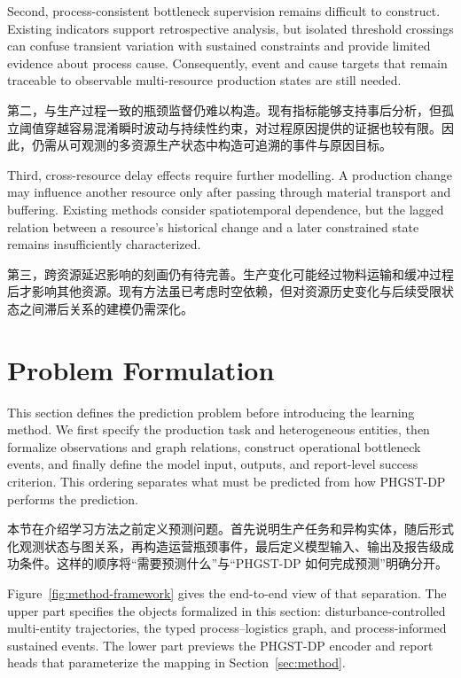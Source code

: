 \documentclass[a4paper,fleqn]{cas-dc}
\newcommand{\zhpara}[1]{%
  \par\begingroup\small\color{black!72}\noindent #1\par\endgroup}
\begin{document}
Second, process-consistent bottleneck supervision remains difficult to construct. Existing indicators support retrospective analysis, but isolated threshold crossings can confuse transient variation with sustained constraints and provide limited evidence about process cause. Consequently, event and cause targets that remain traceable to observable multi-resource production states are still needed.

\zhpara{第二，与生产过程一致的瓶颈监督仍难以构造。现有指标能够支持事后分析，但孤立阈值穿越容易混淆瞬时波动与持续性约束，对过程原因提供的证据也较有限。因此，仍需从可观测的多资源生产状态中构造可追溯的事件与原因目标。}

Third, cross-resource delay effects require further modelling. A production change may influence another resource only after passing through material transport and buffering. Existing methods consider spatiotemporal dependence, but the lagged relation between a resource's historical change and a later constrained state remains insufficiently characterized.

\zhpara{第三，跨资源延迟影响的刻画仍有待完善。生产变化可能经过物料运输和缓冲过程后才影响其他资源。现有方法虽已考虑时空依赖，但对资源历史变化与后续受限状态之间滞后关系的建模仍需深化。}

\section{Problem Formulation}\label{sec:problem}

This section defines the prediction problem before introducing the learning method. We first specify the production task and heterogeneous entities, then formalize observations and graph relations, construct operational bottleneck events, and finally define the model input, outputs, and report-level success criterion. This ordering separates what must be predicted from how PHGST-DP performs the prediction.

\zhpara{本节在介绍学习方法之前定义预测问题。首先说明生产任务和异构实体，随后形式化观测状态与图关系，再构造运营瓶颈事件，最后定义模型输入、输出及报告级成功条件。这样的顺序将“需要预测什么”与“PHGST-DP 如何完成预测”明确分开。}

Figure~\ref{fig:method-framework} gives the end-to-end view of that separation. The upper part specifies the objects formalized in this section: disturbance-controlled multi-entity trajectories, the typed process--logistics graph, and process-informed sustained events. The lower part previews the PHGST-DP encoder and report heads that parameterize the mapping in Section~\ref{sec:method}.
\end{document}
